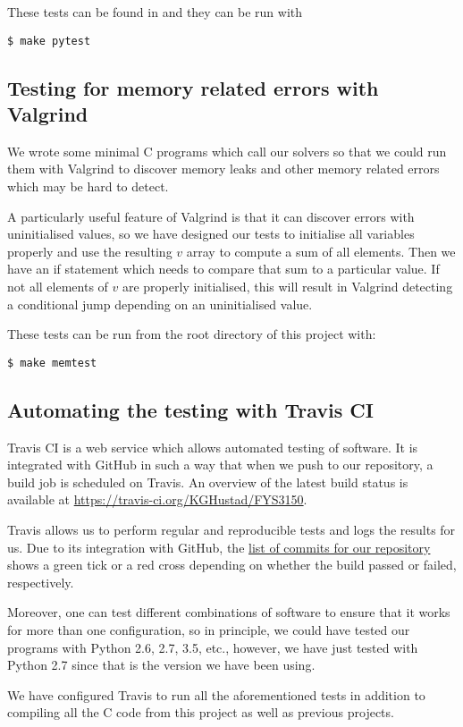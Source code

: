 These tests can be found in  and they can be run with

\begin{verbatim}
$ make pytest
\end{verbatim}


\subsection{Testing for memory related errors with Valgrind}
\label{appx:testing:valgrind}
We wrote some minimal C programs which call our solvers so that we could run them with Valgrind to discover memory leaks and other memory related errors which may be hard to detect.

A particularly useful feature of Valgrind is that it can discover errors with uninitialised values, so we have designed our tests to initialise all variables properly and use the resulting $v$ array to compute a sum of all elements. Then we have an if statement which needs to compare that sum to a particular value. If not all elements of $v$ are properly initialised, this will result in Valgrind detecting a conditional jump depending on an uninitialised value.

These tests can be run from the root directory of this project with:

\begin{verbatim}
$ make memtest
\end{verbatim}

\subsection{Automating the testing with Travis CI}
\label{appx:testing:travis}
Travis CI is a web service which allows automated testing of software. It is integrated with GitHub in such a way that when we push to our repository, a build job is scheduled on Travis. An overview of the latest build status is available at \url{https://travis-ci.org/KGHustad/FYS3150}.

Travis allows us to perform regular and reproducible tests and logs the results for us. Due to its integration with GitHub, the \href{https://github.com/KGHustad/FYS3150/commits/master}{list of commits for our repository} shows a green tick or a red cross depending on whether the build passed or failed, respectively.

Moreover, one can test different combinations of software to ensure that it works for more than one configuration, so in principle, we could have tested our programs with Python 2.6, 2.7, 3.5, etc., however, we have just tested with Python 2.7 since that is the version we have been using.

We have configured Travis to run all the aforementioned tests in addition to compiling all the C code from this project as well as previous projects.

